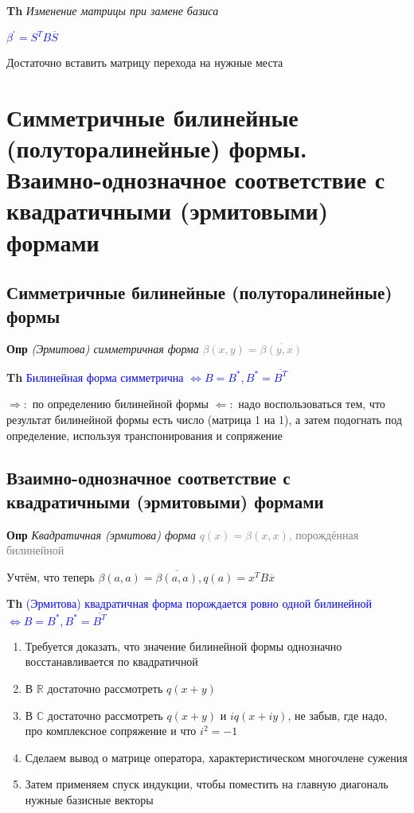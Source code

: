 \documentclass[a4paper, 14pt]{article}
\begin{document}
    \textbf{Th} \textit{Изменение матрицы при замене базиса}

    \textcolor{blue}{$\beta^{'} = S^T B \overline{S}$}

    Достаточно вставить матрицу перехода на нужные места

    \section{Симметричные билинейные (полуторалинейные) формы.
    Взаимно-однозначное соответствие с квадратичными (эрмитовыми) формами}

    \subsection{Симметричные билинейные (полуторалинейные) формы}

    \textbf{Опр} \textit{(Эрмитова) симметричная форма} \textcolor{gray}{$\beta (x, y) = \overline{\beta (y, x)}$}

    \textbf{Th} \textcolor{blue}{Билинейная форма симметрична $\Leftrightarrow B = B^*, B^* = \overline{B^T}$}

    $\Rightarrow:$ по определению билинейной формы
    $\Leftarrow:$ надо воспользоваться тем, что результат билинейной формы есть число (матрица 1 на 1), а затем
    подогнать под определение, используя транспонирования и сопряжение

    \subsection{Взаимно-однозначное соответствие с квадратичными (эрмитовыми) формами}

    \textbf{Опр} \textit{Квадратичная (эрмитова) форма} \textcolor{gray}{$q(x) = \beta (x, x)$, порождённая билинейной}

    Учтём, что теперь $\beta (a, a) = \overline{\beta (a, a)}, q(a) =  x^T B \overline{x}$

    \textbf{Th} \textcolor{blue}{(Эрмитова) квадратичная форма порождается ровно одной билинейной $\Leftrightarrow B
    = B^*, B^* = \overline{B^T}$}

    \begin{enumerate}
        \item Требуется доказать, что значение билинейной формы однозначно восстанавливается по квадратичной
        \item В $\mathbb{R}$ достаточно рассмотреть $q(x + y)$
        \item В $\mathbb{C}$ достаточно рассмотреть $q(x + y)$ и $iq(x + iy)$, не забыв, где надо, про
        комплексное сопряжение и что $i^2 = -1$
        \item Сделаем вывод о матрице оператора, характеристическом многочлене сужения
        \item Затем применяем спуск индукции, чтобы поместить на главную диагональ нужные базисные векторы
    \end{enumerate}
\end{document}
